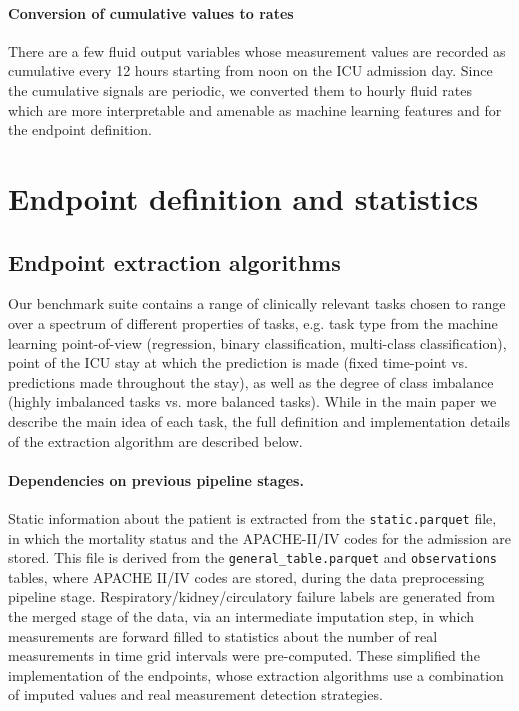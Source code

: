 \documentclass{article}
\begin{document}
\paragraph{Conversion of cumulative values to rates} There are a few fluid output variables whose measurement values are recorded as cumulative every 12 hours starting from noon on the ICU admission day. Since the cumulative signals are periodic, we converted them to hourly fluid rates which are more interpretable and amenable as machine learning features and for the endpoint
definition.

\section*{Endpoint definition and statistics}

\subsection*{Endpoint extraction algorithms}

Our benchmark suite contains a range of clinically relevant tasks chosen to range over a spectrum of different properties of tasks, e.g. task type from the machine learning point-of-view (regression, binary classification, multi-class classification), point of the ICU stay at which the prediction is made (fixed time-point vs. predictions made throughout the stay), as well as the degree of class imbalance (highly imbalanced tasks vs. more balanced tasks). While in the main paper we describe the main idea of each task, the full definition and implementation details of the extraction algorithm are described below.

\paragraph{Dependencies on previous pipeline stages.}Static information about the patient is extracted from the \texttt{static.parquet} file, in which the mortality status and the APACHE-II/IV codes for the admission are stored. This file is derived from the \texttt{general\_table.parquet} and \texttt{observations} tables, where APACHE II/IV codes are stored, during the data preprocessing pipeline stage. Respiratory/kidney/circulatory failure labels are generated from the merged stage of the data, via an intermediate imputation step, in which measurements are forward filled to statistics about the number of real measurements in time grid intervals were pre-computed. These simplified the implementation of the endpoints, whose extraction algorithms use a combination of imputed values and real measurement detection strategies.
\end{document}
